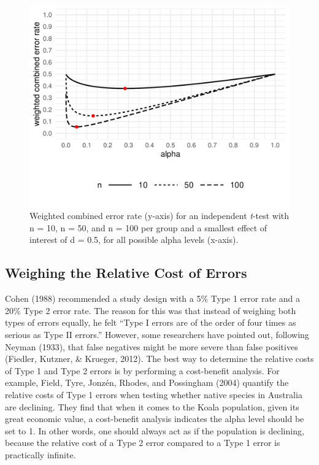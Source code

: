 \documentclass[
  english,
  ,jou, a4paper,floatsintext]{apa6}
\begin{document}
\begin{figure}
\centering
\includegraphics{Justify_in_Practice_files/figure-latex/weight-plot-1.pdf}
\caption{\label{fig:weight-plot}Weighted combined error rate (y-axis) for an independent \emph{t}-test with n = 10, n = 50, and n = 100 per group and a smallest effect of interest of d = 0.5, for all possible alpha levels (x-axis).}
\end{figure}

\hypertarget{weighing-the-relative-cost-of-errors}{%
\subsection{Weighing the Relative Cost of Errors}\label{weighing-the-relative-cost-of-errors}}

Cohen (1988) recommended a study design with a 5\% Type 1 error rate and a 20\% Type 2 error rate. The reason for this was that instead of weighing both types of errors equally, he felt ``Type I errors are of the order of four times as serious as Type II errors.'' However, some researchers have pointed out, following Neyman (1933), that false negatives might be more severe than false positives (Fiedler, Kutzner, \& Krueger, 2012). The best way to determine the relative costs of Type 1 and Type 2 errors is by performing a cost-benefit analysis. For example, Field, Tyre, Jonzén, Rhodes, and Possingham (2004) quantify the relative costs of Type 1 errors when testing whether native species in Australia are declining. They find that when it comes to the Koala population, given its great economic value, a cost-benefit analysis indicates the alpha level should be set to 1. In other words, one should always act as if the population is declining, because the relative cost of a Type 2 error compared to a Type 1 error is practically infinite.
\end{document}
